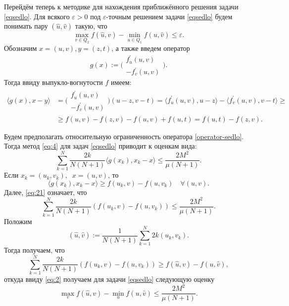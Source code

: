 Перейдём теперь к методике для нахождения приближённого решения задачи \eqref{eqsedlo}. Для всякого $\varepsilon > 0$ под $\varepsilon$-точным решением задачи \eqref{eqsedlo} будем понимать пару $(\widehat{u}, \widehat{v})$ такую, что $$\max_{v \in Q_2} f(\widehat{u}, v) - \min_{u \in Q_1} f(u, \widehat{v}) \leq \varepsilon.$$ Обозначим $x = (u, v), y = (z, t)$, а также введем оператор 
\begin{equation}\label{operator-sedlo}
g(x) := \Bigg( 
\begin{aligned}
f^{'}_{u}(u,v)\\
-f^{'}_{v}(u,v)
\end{aligned}
\Bigg).
\end{equation}
Тогда ввиду выпукло-вогнутости $f$ имеем: 
\begin{equation}
\begin{aligned}
\langle g(x), x - y \rangle &=
 \Bigg( 
\begin{aligned}
f^{'}_{u}(u,v)\\
-f^{'}_{v}(u,v)
\end{aligned}
\Bigg)
 (u - z, v - t)  = \langle f^{'}_{u}(u,v), u - z \rangle - \langle f^{'}_{v}(u,v), v - t \rangle \geq \\&
 \geq f(u, v) - f(z, v) 
- f(u, v)+ f(u, t)=  f(u,t) - f(z, v).
\end{aligned}
\end{equation}

Будем предполагать относительную ограниченность оператора \eqref{operator-sedlo}. Тогда метод \eqref{eq:4} для задач \eqref{eqsedlo} приводит к оценкам вида:
\begin{equation} \label{eq:21}
\sum_{k=1}^{N} \frac{2k}{N(N+1)} \langle g(x_k), x_k -x\rangle \leq \frac{2 M^2}{\mu (N+1)}.
\end{equation}
Если $x_k = (u_k, v_k), \;\; x = (u, v)$, то  
\begin{equation}
\langle g(x_k), x_k -x\rangle \geq f(u_k,v) - f(u, v_k) \quad \forall (u, v).
\end{equation}
Далее, \eqref{eq:21} означает, что 
\begin{equation}
\sum_{k=1}^{N} \frac{2k}{N(N+1)} (f(u_k,v) - f(u, v_k)) \leq \frac{2M^2}{\mu (N+1)}.
\end{equation}
Положим
\begin{equation}
(\widehat{u}, \widehat{v}) := \frac{1}{N(N+1)} \sum_{k=1}^{N} 2k (u_k,v_k).
\end{equation}
Тогда получаем, что
\begin{equation}
\sum_{k=1}^{N} \frac{2k}{N(N+1)} (f(u_k, v) - f(u, v_k)) \geq f(\widehat{u}, v) - f(u, \widehat{v}), 
\end{equation}
откуда ввиду \eqref{eq:2} получаем для задачи \eqref{eqsedlo} следующую оценку
\begin{equation}
\max_{v} f(\widehat{u}, v) - \min_{u} f(u, \widehat{v}) \leq \frac{2M^2}{\mu (N+1)}.
\end{equation}



